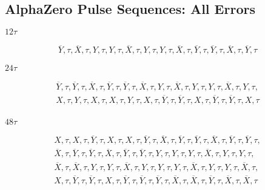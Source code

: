 \subsection{AlphaZero Pulse Sequences: All Errors}

\noindent $12\tau$

\begin{equation*}
\begin{aligned}
    \overline{Y}, \tau, \overline{X}, \tau, Y, \tau, Y, \tau, \overline{X}, \tau, Y, \tau, Y, \tau, \overline{X}, \tau, \overline{Y}, \tau, \overline{Y}, \tau, \overline{X}, \tau, \overline{Y}, \tau
\end{aligned}
\end{equation*}

\noindent $24\tau$

\begin{equation*}
\begin{aligned}
    \overline{Y}, \tau, \overline{Y}, \tau, \overline{X}, \tau, \overline{Y}, \tau, \overline{Y}, \tau, \overline{X}, \tau, Y, \tau, \overline{X}, \tau, Y, \tau, Y, \tau, \overline{X}, \tau, Y, \tau, \\
    X, \tau, Y, \tau, X, \tau, X, \tau, Y, \tau, X, \tau, \overline{Y}, \tau, \overline{Y}, \tau, X, \tau, \overline{Y}, \tau, \overline{Y}, \tau, X, \tau\\
\end{aligned}
\end{equation*}

\noindent $48\tau$

\begin{equation*}
\begin{aligned}
    X, \tau, X, \tau, \overline{Y}, \tau, X, \tau, X, \tau, \overline{Y}, \tau, \overline{X}, \tau, \overline{Y}, \tau, \overline{Y}, \tau, \overline{X}, \tau, \overline{Y}, \tau, \overline{Y}, \tau, \\
    \overline{X}, \tau, \overline{Y}, \tau, \overline{Y}, \tau, \overline{X}, \tau, \overline{Y}, \tau, \overline{Y}, \tau, Y, \tau, Y, \tau, Y, \tau, \overline{X}, \tau, Y, \tau, Y, \tau,\\
    \overline{X}, \tau, \overline{X}, \tau, Y, \tau, Y, \tau, \overline{X}, \tau, Y, \tau, Y, \tau, Y, \tau, \overline{X}, \tau, Y, \tau, Y, \tau, \overline{X}, \tau,\\
    X, \tau, \overline{Y}, \tau, \overline{Y}, \tau, X, \tau, \overline{Y}, \tau, \overline{Y}, \tau, \overline{Y}, \tau, \overline{X}, \tau, \overline{X}, \tau, \overline{Y}, \tau, \overline{X}, \tau, \overline{X}, \tau\\
\end{aligned}
\end{equation*}
